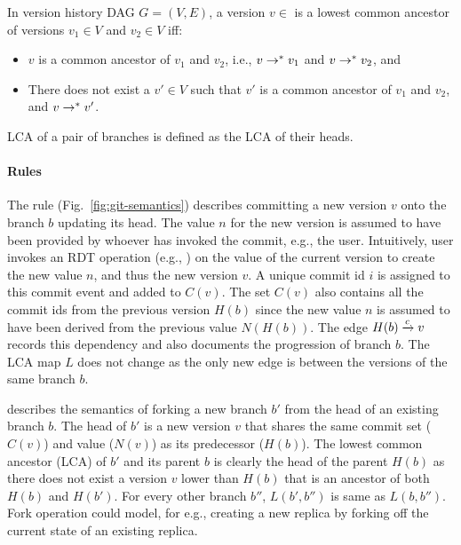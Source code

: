 \begin{definition}
  In version history DAG $G = (V,E)$, a version $v\in$ is a lowest common
  ancestor of versions $v_1 \in V$ and $v_2 \in V$ iff:
  \begin{itemize}
    \item $v$ is a common ancestor of $v_1$ and $v_2$, i.e., $v
      \rightarrow^{*} v_1$ and $v \rightarrow^{*} v_2$, and
    \item There does not exist a $v'\in V$ such that $v'$ is a common
      ancestor of $v_1$ and $v_2$, and $v \rightarrow^{*} v'$.
  \end{itemize}
  LCA of a pair of branches is defined as the LCA of their heads.
\end{definition}

\paragraph{Rules} The rule 
(Fig.~\ref{fig:git-semantics}) describes committing a new version $v$
onto the branch $b$ updating its head. The value $n$ for the new
version is assumed to have been provided by whoever has invoked the
commit, e.g., the user. Intuitively, user invokes an RDT operation
(e.g., ) on the value of the current version to create the
new value $n$, and thus the new version $v$. A unique commit id $i$ is
assigned to this commit event and added to $C(v)$. The set $C(v)$
also contains all the commit ids from the previous version $H(b)$
since the new value $n$ is assumed to have been derived from the
previous value $N(H(b))$. The edge $H(b) \xrightarrow{c} v$ records this
dependency and also documents the progression of branch $b$. The LCA
map $L$ does not change as the only new edge is between the versions
of the same branch $b$.

 describes the semantics of forking a new branch $b'$
from the head of an existing branch $b$. The head of $b'$ is a new
version $v$ that shares the same commit set ($C(v)$) and value
($N(v)$) as its predecessor ($H(b)$). The lowest common ancestor (LCA)
of $b'$ and its parent $b$ is clearly the head of the parent $H(b)$ as
there does not exist a version $v$ lower than $H(b)$ that is an
ancestor of both $H(b)$ and $H(b')$. For every other branch $b''$,
$L(b',b'')$ is same as $L(b,b'')$. Fork operation could model, for
e.g., creating a new replica by forking off the current state of an
existing replica.

